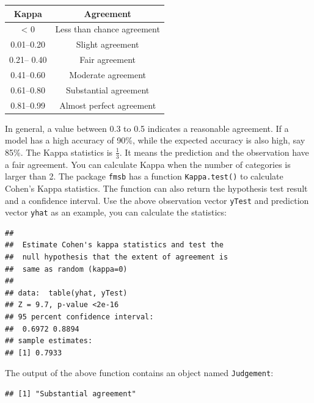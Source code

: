 \documentclass[12pt,]{krantz}
\makeatletter
\newenvironment{Shaded}{\begin{snugshade}}{\end{snugshade}}
\newcommand{\CommentTok}[1]{\textcolor[rgb]{0.37,0.37,0.37}{\textit{#1}}}
\newcommand{\KeywordTok}[1]{\textcolor[rgb]{0.27,0.27,0.27}{\textbf{#1}}}
\newcommand{\NormalTok}[1]{#1}
\newcommand{\OperatorTok}[1]{\textcolor[rgb]{0.43,0.43,0.43}{\textbf{#1}}}
\newenvironment{kframe}{%
\medskip{}
\setlength{\fboxsep}{.8em}
 \def\at@end@of@kframe{}%
 \ifinner\ifhmode%
  \def\at@end@of@kframe{\end{minipage}}%
  \begin{minipage}{\columnwidth}%
 \fi\fi%
 \def\FrameCommand##1{\hskip\@totalleftmargin \hskip-\fboxsep
 \colorbox{shadecolor}{##1}\hskip-\fboxsep
     \hskip-\linewidth \hskip-\@totalleftmargin \hskip\columnwidth}%
 \MakeFramed {\advance\hsize-\width
   \@totalleftmargin\z@ \linewidth\hsize
   \@setminipage}}%
 {\par\unskip\endMakeFramed%
 \at@end@of@kframe}
\renewenvironment{Shaded}{\begin{kframe}}{\end{kframe}}
\makeatother
\begin{document}
\begin{longtable}[]{@{}cc@{}}
\toprule
Kappa & Agreement\tabularnewline
\midrule
\endhead
\textless{} 0 & Less than chance agreement\tabularnewline
0.01--0.20 & Slight agreement\tabularnewline
0.21-- 0.40 & Fair agreement\tabularnewline
0.41--0.60 & Moderate agreement\tabularnewline
0.61--0.80 & Substantial agreement\tabularnewline
0.81--0.99 & Almost perfect agreement\tabularnewline
\bottomrule
\end{longtable}

In general, a value between 0.3 to 0.5 indicates a reasonable agreement. If a model has a high accuracy of 90\%, while the expected accuracy is also high, say 85\%. The Kappa statistics is \(\frac{1}{3}\). It means the prediction and the observation have a fair agreement. You can calculate Kappa when the number of categories is larger than 2. The package \texttt{fmsb} has a function \texttt{Kappa.test()} to calculate Cohen's Kappa statistics. The function can also return the hypothesis test result and a confidence interval. Use the above observation vector \texttt{yTest} and prediction vector \texttt{yhat} as an example, you can calculate the statistics:

\begin{Shaded}
\end{Shaded}

\begin{verbatim}
## 
##  Estimate Cohen's kappa statistics and test the
##  null hypothesis that the extent of agreement is
##  same as random (kappa=0)
## 
## data:  table(yhat, yTest)
## Z = 9.7, p-value <2e-16
## 95 percent confidence interval:
##  0.6972 0.8894
## sample estimates:
## [1] 0.7933
\end{verbatim}

The output of the above function contains an object named \texttt{Judgement}:

\begin{Shaded}
\end{Shaded}

\begin{verbatim}
## [1] "Substantial agreement"
\end{verbatim}
\end{document}
